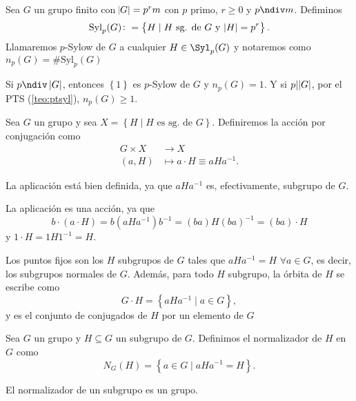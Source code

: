 \begin{defi}
    Sea $G$ un grupo finito con $\abs{G} = p^rm$ con $p$ primo, $r \geq 0$ y $p \ndiv m$. Defiminos
    \[
        \text{Syl}_p(G) \colon = \left\{H \mid H \text{ sg. de } G \text{ y } \abs{H} = p^r \right\}.
    \]
    Llamaremos $p$-Sylow de $G$ a cualquier $H \in \Syl_p(G)$ y notaremos como $n_p(G) = \# \text{Syl}_p(G)$
\end{defi}

\begin{obs}
    Si $p \ndiv\, \abs{G}$, entonces $\left\{ 1 \right\}$ es $p$-Sylow de $G$ y $n_p(G) = 1$. Y si
    $p \vert \abs{G}$, por el PTS (\ref{teo:ptsyl}), $n_p(G) \geq 1$.
\end{obs}

\begin{defi}
    Sea $G$ un grupo y sea $X = \left\{ H \mid H \text{ es sg. de } G\right\}$. Definiremos la acción por
    conjugación como
    \[
        \begin{aligned}
            G \times X &\to X \\
            (a, H) &\mapsto a\cdot H \equiv aHa^{-1}.
        \end{aligned}
    \]
\end{defi}

\begin{obs}
    La aplicación está bien definida, ya que $aHa^{-1}$ es, efectivamente, subgrupo de $G$.
\end{obs}

\begin{obs}
    La aplicación es una acción, ya que
    \[
        b \cdot (a \cdot H) = b\left( aHa^{-1} \right)b^{-1} = (ba)H(ba)^{-1} = (ba) \cdot H
    \]
    y $1 \cdot H = 1 H 1^{-1} = H$.
\end{obs}

\begin{obs}
    Los puntos fijos son los $H$ subgrupos de $G$ tales que $aHa^{-1} = H$ $\forall a \in G$, es decir,
    los subgrupos normales de $G$. Además, para todo $H$ subgrupo, la órbita de $H$
    se escribe como
    \[
        G\cdot H = \left\{ aHa^{-1} \mid a \in G \right\},
    \]
    y es el conjunto de conjugados de $H$ por un elemento de $G$
\end{obs}

\begin{defi}
    Sea $G$ un grupo y $H \subseteq G$ un subgrupo de $G$. Definimos el normalizador de $H$ en $G$ como
    \[
        N_G(H) = \left\{ a \in G \mid aHa^{-1} = H \right\}.
    \]
\end{defi}
\begin{obs}
    El normalizador de un subgrupo es un grupo.
\end{obs}

